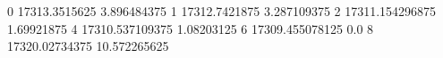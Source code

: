 0 17313.3515625 3.896484375
1 17312.7421875 3.287109375
2 17311.154296875 1.69921875
4 17310.537109375 1.08203125
6 17309.455078125 0.0
8 17320.02734375 10.572265625
